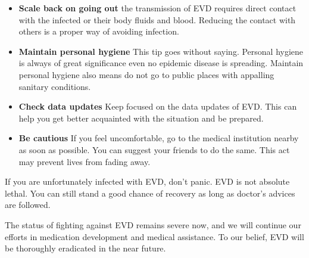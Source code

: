 \begin{itemize}
	\item \textbf{Scale back on going out}
	      the transmission of EVD requires direct contact with the infected or their body fluids and blood. Reducing the contact with others is a proper way of avoiding infection.
	\item \textbf{Maintain personal hygiene}
	      This tip goes without saying. Personal hygiene is always of great significance even no epidemic disease is spreading. Maintain personal hygiene also means do not go to public places with appalling sanitary conditions.
	\item \textbf{Check data updates}
	      Keep focused on the data updates of EVD. This can help you get better acquainted with the situation and be prepared.
	\item \textbf{Be cautious}
	      If you feel uncomfortable, go to the medical institution nearby as soon as possible. You can suggest your friends to do the same. This act may prevent lives from fading away.
\end{itemize}

If you are unfortunately infected with EVD, don't panic. EVD is not absolute lethal. You can still stand a good chance of recovery as long as doctor's advices are followed.

The status of fighting against EVD remains severe now, and we will continue our efforts in medication development and medical assistance. To our belief, EVD will be thoroughly eradicated in the near future.